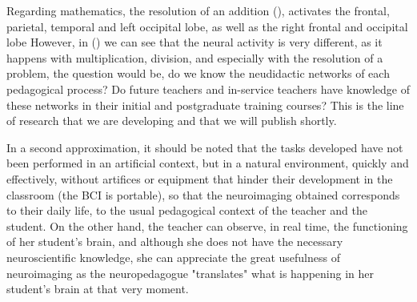 \documentclass[english]{textolivre}
\begin{document}
Regarding mathematics, the resolution of an addition (), activates the frontal, parietal, temporal and left occipital lobe, as well as the right frontal and occipital lobe However, in () we can see that the neural activity is very different, as it happens with multiplication, division, and especially with the resolution of a problem, the question would be, do we know the neudidactic networks of each pedagogical process? Do future teachers and in-service teachers have knowledge of these networks in their initial and postgraduate training courses? This is the line of research that we are developing and that we will publish shortly.

In a second approximation, it should be noted that the tasks developed have not been performed in an artificial context, but in a natural environment, quickly and effectively, without artifices or equipment that hinder their development in the classroom (the BCI is portable), so that the neuroimaging obtained corresponds to their daily life, to the usual pedagogical context of the teacher and the student. On the other hand, the teacher can observe, in real time, the functioning of her student's brain, and although she does not have the necessary neuroscientific knowledge, she can appreciate the great usefulness of neuroimaging as the neuropedagogue "translates" what is happening in her student's brain at that very moment.
\end{document}
